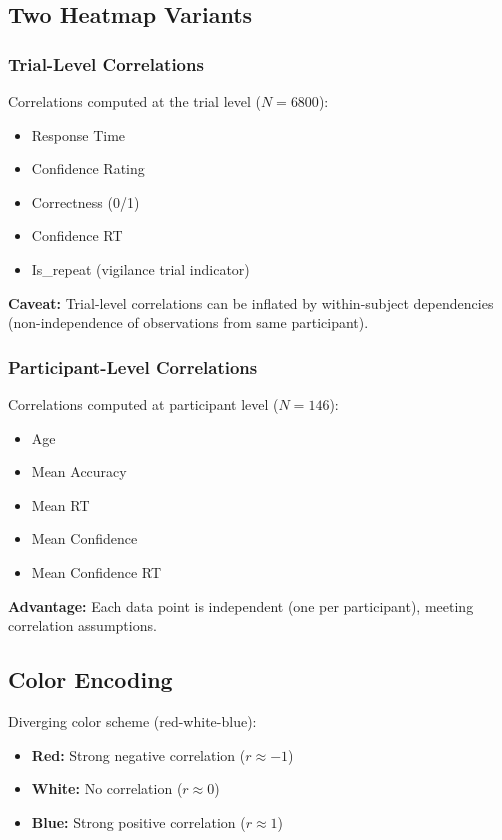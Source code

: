 \documentclass[12pt,a4paper]{article}
\begin{document}
\subsection{Two Heatmap Variants}

\subsubsection{Trial-Level Correlations}

Correlations computed at the trial level ($N=6800$):
\begin{itemize}
    \item Response Time
    \item Confidence Rating
    \item Correctness (0/1)
    \item Confidence RT
    \item Is\_repeat (vigilance trial indicator)
\end{itemize}

\textbf{Caveat:} Trial-level correlations can be inflated by within-subject dependencies (non-independence of observations from same participant).

\subsubsection{Participant-Level Correlations}

Correlations computed at participant level ($N=146$):
\begin{itemize}
    \item Age
    \item Mean Accuracy
    \item Mean RT
    \item Mean Confidence
    \item Mean Confidence RT
\end{itemize}

\textbf{Advantage:} Each data point is independent (one per participant), meeting correlation assumptions.

\subsection{Color Encoding}

Diverging color scheme (red-white-blue):
\begin{itemize}
    \item \textbf{Red:} Strong negative correlation ($r \approx -1$)
    \item \textbf{White:} No correlation ($r \approx 0$)
    \item \textbf{Blue:} Strong positive correlation ($r \approx 1$)
\end{itemize}
\end{document}
